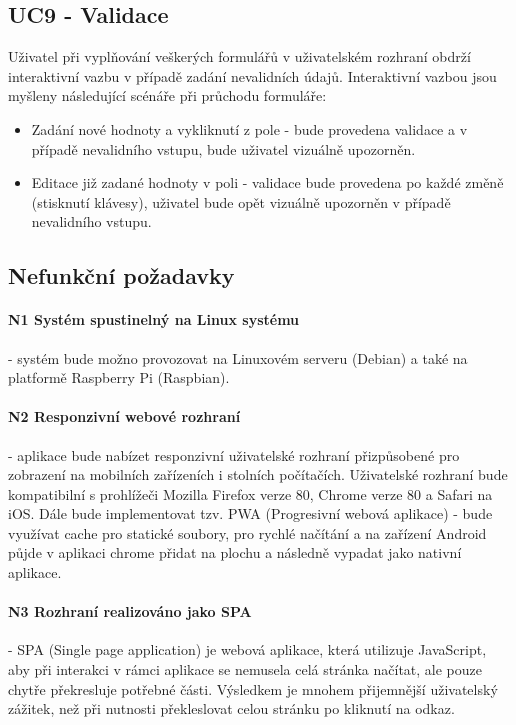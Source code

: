 \subsection{UC9 - Validace}
Uživatel při vyplňování veškerých formulářů v uživatelském rozhraní obdrží interaktivní vazbu v případě zadání nevalidních údajů. Interaktivní vazbou jsou myšleny následující scénáře při průchodu formuláře:
\begin{itemize}
    \item Zadání nové hodnoty a vykliknutí z pole - bude provedena validace a v případě nevalidního vstupu, bude uživatel vizuálně  upozorněn.
    \item Editace již zadané hodnoty v poli - validace bude provedena po každé změně (stisknutí klávesy), uživatel bude opět vizuálně upozorněn v případě nevalidního vstupu.
\end{itemize}


\subsection{Nefunkční požadavky}

\paragraph{N1 Systém spustinelný na Linux systému}
- systém bude možno provozovat na Linuxovém serveru (Debian) a také na platformě Raspberry Pi (Raspbian).

\paragraph{N2 Responzivní webové rozhraní}
- aplikace bude nabízet responzivní uživatelské rozhraní přizpůsobené pro zobrazení na mobilních zařízeních i stolních počítačích. Uživatelské rozhraní bude kompatibilní s prohlížeči Mozilla Firefox verze 80, Chrome verze 80 a Safari na iOS. Dále bude implementovat tzv. PWA (Progresivní webová aplikace) - bude využívat cache pro statické soubory, pro rychlé načítání a na zařízení Android půjde v aplikaci chrome přidat na plochu a následně vypadat jako nativní aplikace.

\paragraph{N3 Rozhraní realizováno jako SPA}
- SPA (Single page application) je webová aplikace, která utilizuje JavaScript, aby při interakci v rámci aplikace se nemusela celá stránka načítat, ale pouze chytře překresluje potřebné části. Výsledkem je mnohem přijemnější uživatelský zážitek, než při nutnosti překleslovat celou stránku po kliknutí na odkaz.

